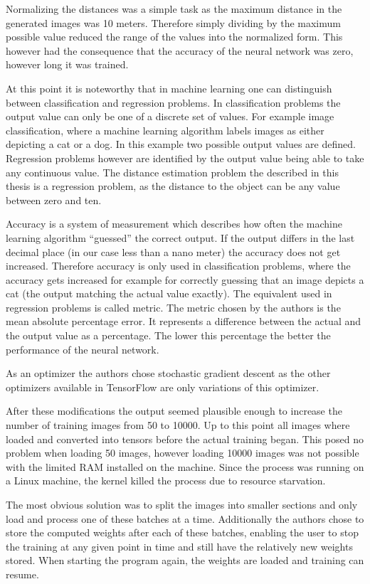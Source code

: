 Normalizing the distances was a simple task as the maximum distance in the generated images was 10 meters. Therefore simply dividing by the maximum possible value reduced the range of the values into the normalized form. This however had the consequence that the accuracy of the neural network was zero, however long it was trained.

At this point it is noteworthy that in machine learning one can distinguish between classification and regression problems. In classification problems the output value can only be one of a discrete set of values. For example image classification, where a machine learning algorithm labels images as either depicting a cat or a dog. In this example two possible output values are defined. Regression problems however are identified by the output value being able to take any continuous value. The distance estimation problem the described in this thesis is a regression problem, as the distance to the object can be any value between zero and ten.

Accuracy is a system of measurement which describes how often the machine learning algorithm ``guessed'' the correct output. If the output differs in the last decimal place (in our case less than a nano meter) the accuracy does not get increased. Therefore accuracy is only used in classification problems, where the accuracy gets increased for example for correctly guessing that an image depicts a cat (the output matching the actual value exactly). The equivalent used in regression problems is called metric. The metric chosen by the authors is the mean absolute percentage error. It represents a difference between the actual and the output value as a percentage. The lower this percentage the better the performance of the neural network.

As an optimizer the authors chose stochastic gradient descent as the other optimizers available in TensorFlow are only variations of this optimizer.

After these modifications the output seemed plausible enough to increase the number of training images from 50 to 10000. Up to this point all images where loaded and converted into tensors before the actual training began. This posed no problem when loading 50 images, however loading 10000 images was not possible with the limited RAM installed on the machine. Since the process was running on a Linux machine, the kernel killed the process due to resource starvation.

The most obvious solution was to split the images into smaller sections and only load and process one of these batches at a time. Additionally the authors chose to store the computed weights after each of these batches, enabling the user to stop the training at any given point in time and still have the relatively new weights stored. When starting the program again, the weights are loaded and training can resume.


